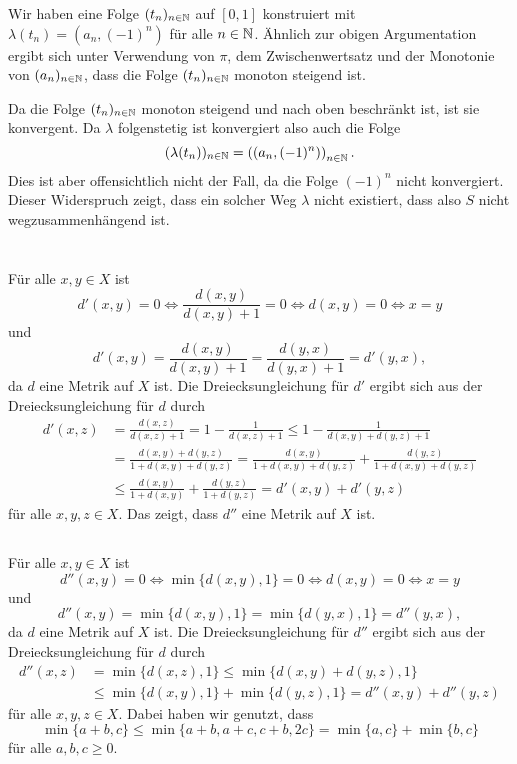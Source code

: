 \documentclass[a4paper,10pt]{article}
\begin{document}
Wir haben eine Folge $(t_n)_{n \in \mathbb{N}}$ auf $[0,1]$ konstruiert mit $\lambda(t_n) = (a_n, (-1)^n)$ für alle $n \in \mathbb{N}$. Ähnlich zur obigen Argumentation ergibt sich unter Verwendung von $\pi$, dem Zwischenwertsatz und der Monotonie von $(a_n)_{n \in \mathbb{N}}$, dass die Folge $(t_n)_{n \in \mathbb{N}}$ monoton steigend ist.

Da die Folge $(t_n)_{n \in \mathbb{N}}$ monoton steigend und nach oben beschränkt ist, ist sie konvergent. Da $\lambda$ folgenstetig ist konvergiert also auch die Folge
\[
 (\lambda(t_n))_{n \in \mathbb{N}} = \left(\left(a_n,(-1)^n\right)\right)_{n \in \mathbb{N}}.
\]
Dies ist aber offensichtlich nicht der Fall, da die Folge $(-1)^n$ nicht konvergiert. Dieser Widerspruch zeigt, dass ein solcher Weg $\lambda$ nicht existiert, dass also $S$ nicht wegzusammenhängend ist.













\section{}


\subsection{}
Für alle $x,y \in X$ ist
\[
 d'(x,y) = 0 \Leftrightarrow \frac{d(x,y)}{d(x,y)+1} = 0 \Leftrightarrow d(x,y) = 0 \Leftrightarrow x=y
\]
und
\[
 d'(x,y) = \frac{d(x,y)}{d(x,y)+1} = \frac{d(y,x)}{d(y,x)+1} = d'(y,x),
\]
da $d$ eine Metrik auf $X$ ist. Die Dreiecksungleichung für $d'$ ergibt sich aus der Dreiecksungleichung für $d$ durch
\begin{align*}
 d'(x,z)
 &= \frac{d(x,z)}{d(x,z)+1}
 = 1 - \frac{1}{d(x,z)+1}
 \leq 1 - \frac{1}{d(x,y)+d(y,z)+1} \\
 &= \frac{d(x,y)+d(y,z)}{1+d(x,y)+d(y,z)}
 = \frac{d(x,y)}{1+d(x,y)+d(y,z)} + \frac{d(y,z)}{1+d(x,y)+d(y,z)}\\
 &\leq \frac{d(x,y)}{1+d(x,y)} + \frac{d(y,z)}{1+d(y,z)}
 = d'(x,y) + d'(y,z)
\end{align*}
für alle $x,y,z \in X$. Das zeigt, dass $d''$ eine Metrik auf $X$ ist.


\subsection{}
Für alle $x,y \in X$ ist
\[
 d''(x,y) = 0
 \Leftrightarrow \min\{d(x,y),1\} = 0
 \Leftrightarrow d(x,y) = 0
 \Leftrightarrow x=y
\]
und
\[
 d''(x,y) = \min\{d(x,y),1\} = \min\{d(y,x),1\} = d''(y,x),
\]
da $d$ eine Metrik auf $X$ ist. Die Dreiecksungleichung für $d''$ ergibt sich aus der Dreiecksungleichung für $d$ durch
\begin{align*}
 d''(x,z)
 &= \min\{d(x,z),1\}
 \leq \min\{d(x,y)+d(y,z),1\} \\
 &\leq \min\{d(x,y),1\} + \min\{d(y,z),1\}
 = d''(x,y)+d''(y,z)
\end{align*}
für alle $x,y,z \in X$. Dabei haben wir genutzt, dass
\[
 \min\{a+b,c\} \leq \min\{a+b,a+c,c+b,2c\} = \min\{a,c\}+\min\{b,c\}
\]
für alle $a,b,c \geq 0$.
\end{document}
